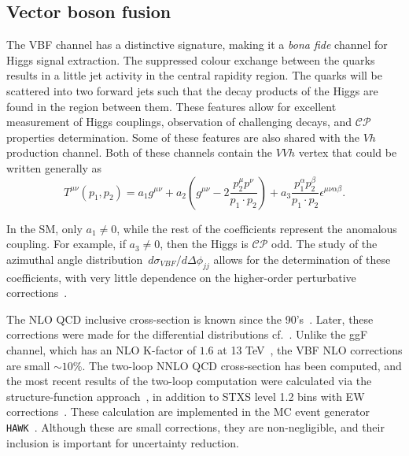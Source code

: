 \subsection{Vector boson fusion}
\par The VBF channel has a distinctive signature, making it a\textit{ bona fide} channel for Higgs signal extraction. The suppressed colour exchange between the quarks results in a little jet activity in the central rapidity region. The quarks will be scattered into two forward jets such that the decay products of the Higgs are found in the region between them.  These features allow for excellent measurement of Higgs couplings, observation of challenging decays, and $\mathcal{CP}$ properties determination. Some of these features are also shared with the $Vh$ production channel. Both of these channels contain the $VVh$ vertex that could be written generally as~\cite{LHCHiggsCrossSectionWorkingGroup:2016ypw}
\begin{equation}
	T^{\mu \nu}(p_1,p_2) = a_1 g^{\mu \nu}+ a_2  \left(g^{\mu \nu}- 2\frac{p^\mu_{2} p^\nu }{p_1 \cdot p_2} \right)  + a_3 \frac{p_1^\alpha p_2^ \beta}{p_1 \cdot p_2}\epsilon^{\mu \nu \alpha \beta}. 
\end{equation} 
\par In the SM, only $a_1\neq0$, while the rest of the coefficients represent the anomalous coupling. For example, if $a_3 \neq0$, then the Higgs is  $\mathcal{CP}$ odd. The study of the azimuthal angle distribution~$d \sigma_{VBF} / d \Delta \phi_{jj}$ allows for the determination of these coefficients, with very little dependence on the higher-order perturbative corrections~\cite{hankele2006anomalous}.
\par The NLO QCD inclusive cross-section is known since the 90's~\cite{Han:1992hr}. Later, these corrections were made for the differential distributions cf.~\cite{Figy:2003nv,Berger:2004pca}. Unlike the ggF channel, which has an NLO  K-factor of $1.6$ at 13 TeV~\cite{Gomez-Bock:2007azi}, the VBF NLO corrections are small $\sim 10\%$. The two-loop NNLO QCD cross-section has been computed, and the most recent results of the two-loop computation were calculated via the structure-function approach~\cite{Bolzoni:2010xr}, in addition to STXS level 1.2 bins with EW corrections~\cite{Denner:2014cla}. These calculation are implemented in the MC event generator  \texttt{HAWK}~\cite{Ciccolini:2007jr,Denner:2011id,Denner:2014cla,Denner:2018opp}. Although these are small corrections, they are non-negligible, and their inclusion is important for uncertainty reduction.
